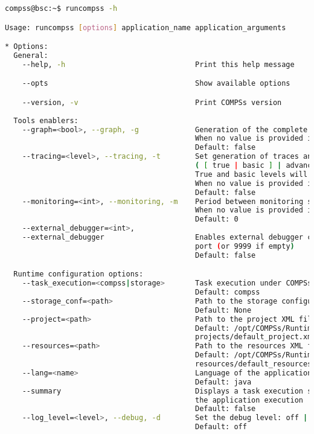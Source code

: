 \begin{lstlisting}[language=bash]
compss@bsc:~$ runcompss -h

Usage: runcompss [options] application_name application_arguments

* Options:
  General:
    --help, -h                              Print this help message

    --opts                                  Show available options

    --version, -v                           Print COMPSs version
    
  Tools enablers:
    --graph=<bool>, --graph, -g             Generation of the complete graph (true/false)
                                            When no value is provided it is set to true
                                            Default: false
    --tracing=<level>, --tracing, -t        Set generation of traces and/or tracing level 
                                            ( [ true | basic ] | advanced | false)
                                            True and basic levels will produce the same traces.
                                            When no value is provided it is set to true
                                            Default: false
    --monitoring=<int>, --monitoring, -m    Period between monitoring samples (milliseconds)
                                            When no value is provided it is set to 2000
                                            Default: 0
    --external_debugger=<int>,
    --external_debugger                     Enables external debugger connection on the specified 
                                            port (or 9999 if empty)
                                            Default: false

  Runtime configuration options:
    --task_execution=<compss|storage>       Task execution under COMPSs or Storage.
                                            Default: compss
    --storage_conf=<path>                   Path to the storage configuration file
                                            Default: None
    --project=<path>                        Path to the project XML file
                                            Default: /opt/COMPSs/Runtime/configuration/xml/
                                            projects/default_project.xml
    --resources=<path>                      Path to the resources XML file
                                            Default: /opt/COMPSs/Runtime/configuration/xml/
                                            resources/default_resources.xml                                                 
    --lang=<name>                           Language of the application (java/c/python)
                                            Default: java
    --summary                               Displays a task execution summary at the end of 
                                            the application execution
                                            Default: false
    --log_level=<level>, --debug, -d        Set the debug level: off | info | debug
                                            Default: off
                                            

\end{lstlisting}
